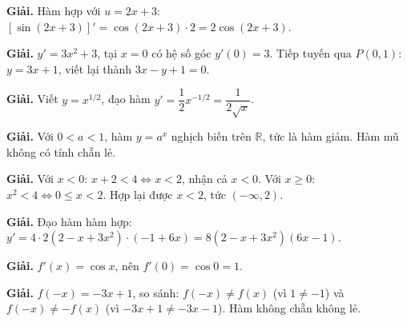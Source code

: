 \documentclass[11pt, a4paper]{article}
\begin{document}
\vspace{0.3cm}
\begin{dapan}[31 — Đáp án A]

\textbf{Giải.} Hàm hợp với $u=2x+3$: $\left[\sin(2x+3)\right]'=\cos(2x+3)\cdot2=2\cos(2x+3)$.


\end{dapan}
\vspace{0.3cm}
\begin{dapan}[32 — Đáp án A]

\textbf{Giải.} $y'=3x^2+3$, tại $x=0$ có hệ số góc $y'(0)=3$. Tiếp tuyến qua $P(0,1)$: $y=3x+1$, viết lại thành $3x-y+1=0$.


\end{dapan}
\vspace{0.3cm}
\begin{dapan}[33 — Đáp án C]

\textbf{Giải.} Viết $y=x^{1/2}$, đạo hàm $y'=\dfrac{1}{2}x^{-1/2}=\dfrac{1}{2\sqrt{x}}$.


\end{dapan}
\vspace{0.3cm}
\begin{dapan}[34 — Đáp án B]

\textbf{Giải.} Với $0<a<1$, hàm $y=a^x$ nghịch biến trên $\mathbb{R}$, tức là hàm giảm. Hàm mũ không có tính chẵn lẻ.


\end{dapan}
\vspace{0.3cm}
\begin{dapan}[35 — Đáp án D]

\textbf{Giải.} Với $x<0$: $x+2<4 \iff x<2$, nhận cả $x<0$. Với $x\ge0$: $x^2<4 \iff 0\le x<2$. Hợp lại được $x<2$, tức $(-\infty,2)$.


\end{dapan}
\vspace{0.3cm}
\begin{dapan}[36 — Đáp án C]

\textbf{Giải.} Đạo hàm hàm hợp: $y'=4\cdot2(2-x+3x^2)\cdot(-1+6x)=8(2-x+3x^2)(6x-1)$.


\end{dapan}
\vspace{0.3cm}
\begin{dapan}[37 — Đáp án A]

\textbf{Giải.} $f'(x)=\cos x$, nên $f'(0)=\cos0=1$.


\end{dapan}
\vspace{0.3cm}
\begin{dapan}[38 — Đáp án C]

\textbf{Giải.} $f(-x)=-3x+1$, so sánh: $f(-x)\ne f(x)$ (vì $1\ne-1$) và $f(-x)\ne-f(x)$ (vì $-3x+1\ne-3x-1$). Hàm không chẵn không lẻ.


\end{dapan}
\end{document}
